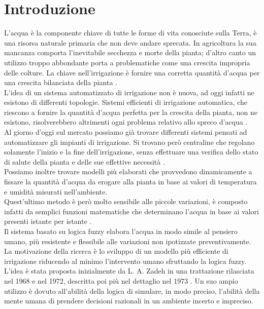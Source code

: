 \documentclass[conference,10pt]{IEEEtran}
\begin{document}
\section{Introduzione}\label{sec:intro}
L'acqua è la componente chiave di tutte le forme di vita conosciute sulla Terra, è una risorsa naturale primaria che non deve andare sprecata. In agricoltura la sua mancanza comporta l'inevitabile secchezza e morte della pianta; d'altro canto un utilizzo troppo abbondante porta a problematiche come una crescita impropria delle colture.
La chiave nell'irrigazione è fornire una corretta quantità d'acqua per una crescita bilanciata della pianta \cite{2}.\\
L'idea di un sistema automatizzato di irrigazione non è nuova, ad oggi infatti ne esistono di differenti topologie. Sistemi efficienti di irrigazione automatica, che riescono a fornire la quantità d'acqua perfetta per la crescita della pianta, non ne esistono, risolverebbero altrimenti ogni problema relativo allo spreco d'acqua \cite{4}.\\
Al giorno d'oggi sul mercato possiamo già trovare differenti sistemi pensati ad automatizzare gli impianti di irrigazione.
Si trovano però centraline che regolano solamente l'inizio e la fine dell'irrigazione, senza effettuare una verifica dello stato di salute della pianta e delle sue effettive necessità \cite{1}.\\
Possiamo inoltre trovare modelli più elaborati che provvedono dinamicamente a fissare la quantità d'acqua da erogare alla pianta in base ai valori di temperatura e umidità misurati nell'ambiente.\\
Quest'ultimo metodo è però molto sensibile alle piccole variazioni, è composto infatti da semplici funzioni matematiche che determinano l'acqua in base ai valori presenti istante per istante \cite{3}. \\
Il sistema basato su logica fuzzy elabora l'acqua in modo simile al pensiero umano, più resistente e flessibile alle variazioni non ipotizzate preventivamente. \\
La motivazione della ricerca è lo sviluppo di un modello più efficiente di irrigazione riducendo al minimo l'intervento umano sfruttando la logica fuzzy.
L'idea è stata proposta inizialmente da L. A. Zadeh in una trattazione rilasciata nel 1968 e nel 1972, descritta poi più nel dettaglio nel 1973 \cite{9}.
Un suo ampio utilizzo è dovuto all'abilità della logica di simulare, in modo preciso, l'abilità della mente umana di prendere decisioni razionali in un ambiente incerto e impreciso.\\
\end{document}
